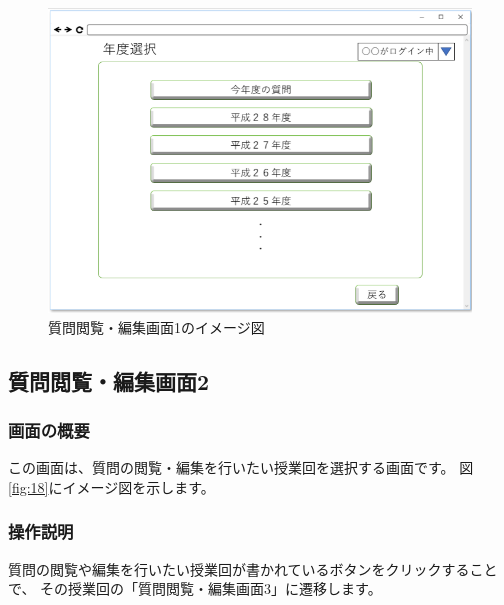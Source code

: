 \begin{figure}[htbp]
  \begin{center}
    \includegraphics[width=1\linewidth,clip]{./img/17.png}
    \caption{質問閲覧・編集画面1のイメージ図}\label{fig:17}
  \end{center}
\end{figure}

\newpage

\subsection{質問閲覧・編集画面2}
\subsubsection{画面の概要}
この画面は、質問の閲覧・編集を行いたい授業回を選択する画面です。
図\ref{fig:18}にイメージ図を示します。

\subsubsection{操作説明}
質問の閲覧や編集を行いたい授業回が書かれているボタンをクリックすることで、
その授業回の「質問閲覧・編集画面3」に遷移します。

